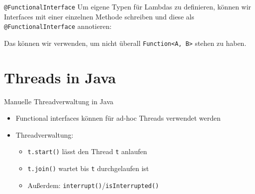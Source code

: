\documentclass{beamer}
\newcommand{\code}[1]{
	\begin{mdframed}
		
	\end{mdframed}
}
\begin{document}
\begin{frame}{\texttt{@FunctionalInterface}}
  Um eigene Typen für Lambdas zu definieren, können wir Interfaces mit einer einzelnen Methode schreiben und diese als \texttt{@FunctionalInterface} annotieren:

  \code{code/myfuncinterface.java}

  Das können wir verwenden, um nicht überall \texttt{Function<A, B>} stehen zu haben.
\end{frame}

\section{Threads in Java}

\begin{frame}{Manuelle Threadverwaltung in Java}
  \code{code/runnable.java}

  \begin{itemize}
    \item Functional interfaces können für ad-hoc Threads verwendet werden
    \item Threadverwaltung:
    \begin{itemize}
      \item \texttt{t.start()} lässt den Thread \texttt{t} anlaufen
      \item \texttt{t.join()} wartet bis \texttt{t} durchgelaufen ist
      \item Außerdem: \texttt{interrupt()}/\texttt{isInterrupted()}
    \end{itemize}
  \end{itemize}
\end{frame}
\end{document}
